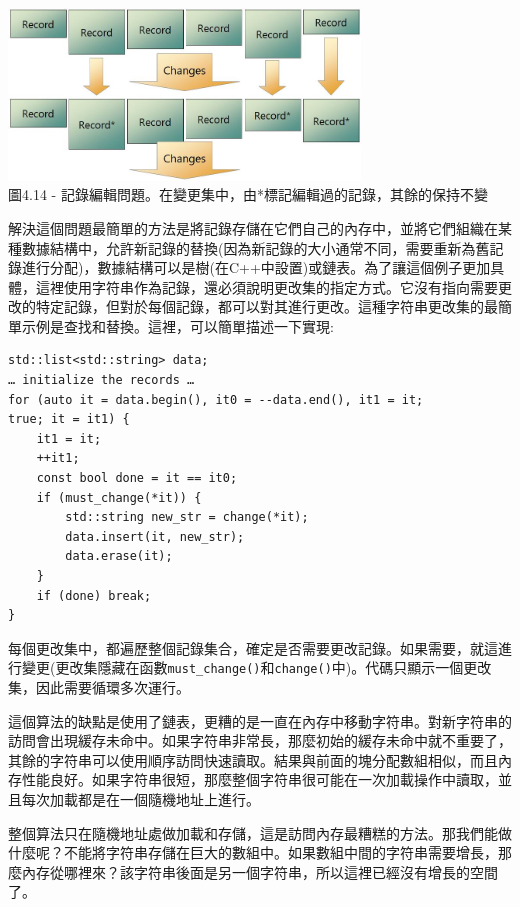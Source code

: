 \begin{center}
\includegraphics[width=0.7\textwidth]{content/1/chapter4/images/14.jpg}\\
圖4.14 - 記錄編輯問題。在變更集中，由*標記編輯過的記錄，其餘的保持不變
\end{center}

解決這個問題最簡單的方法是將記錄存儲在它們自己的內存中，並將它們組織在某種數據結構中，允許新記錄的替換(因為新記錄的大小通常不同，需要重新為舊記錄進行分配)，數據結構可以是樹(在C++中設置)或鏈表。為了讓這個例子更加具體，這裡使用字符串作為記錄，還必須說明更改集的指定方式。它沒有指向需要更改的特定記錄，但對於每個記錄，都可以對其進行更改。這種字符串更改集的最簡單示例是查找和替換。這裡，可以簡單描述一下實現:

\begin{lstlisting}[style=styleCXX]
std::list<std::string> data;
… initialize the records …
for (auto it = data.begin(), it0 = --data.end(), it1 = it;
true; it = it1) {
	it1 = it;
	++it1;
	const bool done = it == it0;
	if (must_change(*it)) {
		std::string new_str = change(*it);
		data.insert(it, new_str);
		data.erase(it);
	}
	if (done) break;
}
\end{lstlisting}

每個更改集中，都遍歷整個記錄集合，確定是否需要更改記錄。如果需要，就這進行變更(更改集隱藏在函數\texttt{must\_change()}和\texttt{change()}中)。代碼只顯示一個更改集，因此需要循環多次運行。

這個算法的缺點是使用了鏈表，更糟的是一直在內存中移動字符串。對新字符串的訪問會出現緩存未命中。如果字符串非常長，那麼初始的緩存未命中就不重要了，其餘的字符串可以使用順序訪問快速讀取。結果與前面的塊分配數組相似，而且內存性能良好。如果字符串很短，那麼整個字符串很可能在一次加載操作中讀取，並且每次加載都是在一個隨機地址上進行。

整個算法只在隨機地址處做加載和存儲，這是訪問內存最糟糕的方法。那我們能做什麼呢？不能將字符串存儲在巨大的數組中。如果數組中間的字符串需要增長，那麼內存從哪裡來？該字符串後面是另一個字符串，所以這裡已經沒有增長的空間了。


